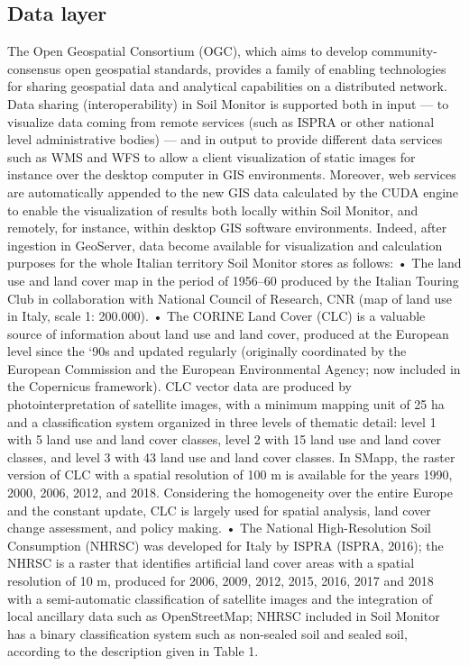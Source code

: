 \documentclass[APA,LATO1COL,doublespace]{WileyNJD-v2}
\begin{document}
\subsection{Data layer}
The Open Geospatial Consortium (OGC), which aims to develop community-consensus open geospatial standards, provides a family of enabling technologies for sharing geospatial data and analytical capabilities on a distributed network. Data sharing (interoperability) in Soil Monitor is supported both in input — to visualize data coming from remote services (such as ISPRA or other national level administrative bodies) — and in output to provide different data services such as WMS and WFS to allow a client visualization of static images for instance over the desktop computer in GIS environments. Moreover, web services are automatically appended to the new GIS data calculated by the CUDA engine to enable the visualization of results both locally within Soil Monitor, and remotely, for instance, within desktop GIS software environments. Indeed, after ingestion in GeoServer, data become available for visualization and calculation purposes for the whole Italian territory Soil Monitor stores as follows:
•	The land use and land cover map in the period of 1956–60 produced by the Italian Touring Club in collaboration with National Council of Research, CNR (map of land use in Italy, scale 1: 200.000).
•	The CORINE Land Cover (CLC) is a valuable source of information about land use and land cover, produced at the European level since the ‘90s and updated regularly (originally coordinated by the European Commission and the European Environmental Agency; now included in the Copernicus framework). CLC vector data are produced by photointerpretation of satellite images, with a minimum mapping unit of 25 ha and a classification system organized in three levels of thematic detail: level 1 with 5 land use and land cover classes, level 2 with 15 land use and land cover classes, and level 3 with 43 land use and land cover classes. In SMapp, the raster version of CLC with a spatial resolution of 100 m is available for the years 1990, 2000, 2006, 2012, and 2018. Considering the homogeneity over the entire Europe and the constant update, CLC is largely used for spatial analysis, land cover change assessment, and policy making.
•	The National High-Resolution Soil Consumption (NHRSC) was developed for Italy by ISPRA (ISPRA, 2016); the NHRSC is a raster that identifies artificial land cover areas with a spatial resolution of 10 m, produced for 2006, 2009, 2012, 2015, 2016, 2017 and 2018 with a semi-automatic classification of satellite images and the integration of local ancillary data such as OpenStreetMap; NHRSC included in Soil Monitor has a binary classification system such as non-sealed soil and sealed soil, according to the description given in Table 1.
\end{document}
